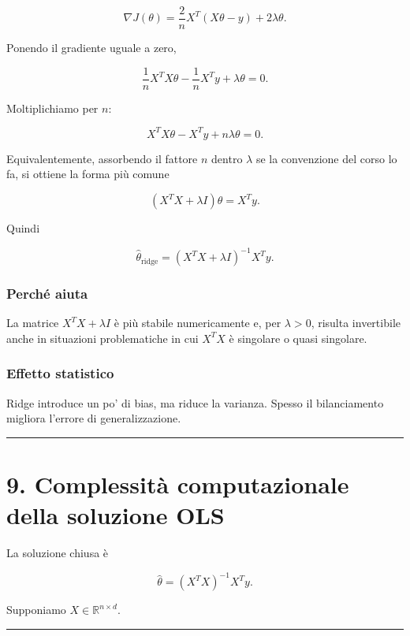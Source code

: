 \documentclass{article}
\begin{document}
\[
\nabla J(\theta)
=
\frac{2}{n}X^T(X\theta-y)+2\lambda\theta.
\]

Ponendo il gradiente uguale a zero,

\[
\frac{1}{n}X^TX\theta - \frac{1}{n}X^Ty + \lambda\theta = 0.
\]

Moltiplichiamo per \(n\):

\[
X^TX\theta - X^Ty + n\lambda\theta = 0.
\]

Equivalentemente, assorbendo il fattore \(n\) dentro \(\lambda\) se la
convenzione del corso lo fa, si ottiene la forma più comune

\[
(X^TX+\lambda I)\theta = X^Ty.
\]

Quindi

\[
\hat\theta_{\text{ridge}}=(X^TX+\lambda I)^{-1}X^Ty.
\]

\subsubsection{Perché aiuta}\label{perchuxe9-aiuta}

La matrice \(X^TX+\lambda I\) è più stabile numericamente e, per
\(\lambda>0\), risulta invertibile anche in situazioni problematiche in
cui \(X^TX\) è singolare o quasi singolare.

\subsubsection{Effetto statistico}\label{effetto-statistico}

Ridge introduce un po' di bias, ma riduce la varianza. Spesso il
bilanciamento migliora l'errore di generalizzazione.

\begin{center}\rule{0.5\linewidth}{0.5pt}\end{center}

\section{9. Complessità computazionale della soluzione
OLS}\label{complessituxe0-computazionale-della-soluzione-ols}

La soluzione chiusa è

\[
\hat\theta=(X^TX)^{-1}X^Ty.
\]

Supponiamo \(X\in\mathbb{R}^{n\times d}\).

\begin{center}\rule{0.5\linewidth}{0.5pt}\end{center}
\end{document}
